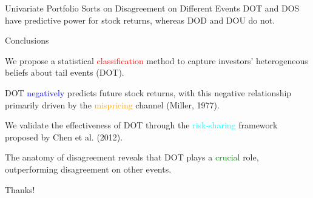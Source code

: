 \documentclass[11pt, aspectratio=169]{beamer}
\newenvironment{wideitemize}{\itemize\addtolength{\itemsep}{10pt}}{\enditemize}
\begin{document}
\begin{frame}{Univariate Portfolio Sorts on Disagreement on Different Events}
DOT and DOS have predictive power for stock returns, whereas DOD and DOU do not.\\
\bigskip
{}
\end{frame}

\begin{frame}{Conclusions}
\begin{wideitemize}
    \item We propose a statistical \textcolor{red}{classification} method to capture investors' heterogeneous beliefs about tail events (DOT).
    \item DOT \textcolor{blue}{negatively} predicts future stock returns, with this negative relationship primarily driven by the \textcolor{orange}{mispricing} channel (Miller, 1977).
    \item We validate the effectiveness of DOT through the \textcolor{cyan}{risk-sharing} framework proposed by Chen et al. (2012).
    \item The anatomy of disagreement reveals that DOT plays a \textcolor{green}{crucial} role, outperforming disagreement on other events.
\end{wideitemize}
\end{frame}

\begin{frame}
    \begin{center}
        {\Huge\calligra Thanks!}
    \end{center}
\end{frame}
\end{document}
